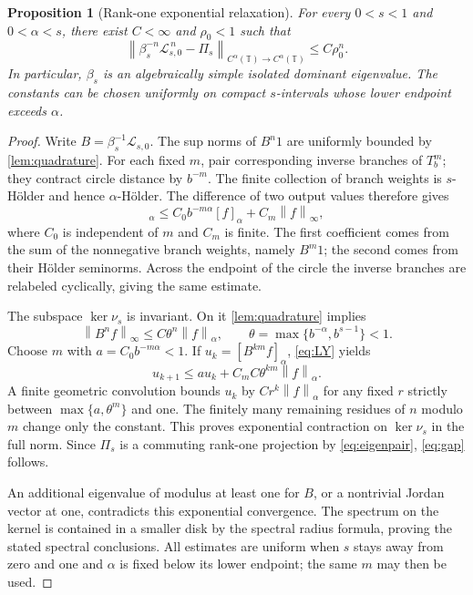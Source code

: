 \documentclass[11pt,a4paper]{article}
\numberwithin{equation}{section}
\newtheorem{proposition}[proposition]{Proposition}
\theoremstyle{definition}
\theoremstyle{remark}
\newcommand{\TT}{\mathbb T}
\newcommand{\Lop}{\mathcal L}
\newcommand{\norm}[1]{\left\lVert#1\right\rVert}
\newcommand{\Proj}{\Pi}
\newcommand{\Holder}{C^\alpha(\TT)}
\begin{document}
\begin{proposition}[Rank-one exponential relaxation]
\label{prop:gap}
For every $0<s<1$ and $0<\alpha<s$, there exist $C<\infty$ and
$\rho_0<1$ such that
\begin{equation}
 \left\|\beta_s^{-n}\Lop_{s,0}^{\,n}-\Proj_s\right\|_{\Holder\to\Holder}
 \leq C\rho_0^n.
 \label{eq:gap}
\end{equation}
In particular, $\beta_s$ is an algebraically simple isolated dominant
eigenvalue. The constants can be chosen uniformly on compact
$s$-intervals whose lower endpoint exceeds $\alpha$.
\end{proposition}
\begin{proof}
Write $B=\beta_s^{-1}\Lop_{s,0}$. The sup norms of $B^n1$ are uniformly
bounded by \cref{lem:quadrature}. For each fixed $m$, pair corresponding
inverse branches of $T_b^m$; they contract circle distance by $b^{-m}$.
The finite collection of branch weights is $s$-H\"older and hence
$\alpha$-H\"older. The difference of two output values therefore gives
\begin{equation}
 [B^mf]_\alpha\leq C_0 b^{-m\alpha}[f]_\alpha+C_m\norm f_\infty,
 \label{eq:LY}
\end{equation}
where $C_0$ is independent of $m$ and $C_m$ is finite. The first
coefficient comes from the sum of the nonnegative branch weights,
namely $B^m1$; the second comes from their H\"older seminorms.
Across the endpoint of the circle the inverse branches are relabeled
cyclically, giving the same estimate.

The subspace $\ker\nu_s$ is invariant. On it \cref{lem:quadrature}
implies
\[
 \norm{B^nf}_\infty\leq C\theta^n\norm f_\alpha,
 \qquad \theta=\max\{b^{-\alpha},b^{s-1}\}<1.
\]
Choose $m$ with $a=C_0b^{-m\alpha}<1$. If
$u_k=[B^{km}f]_\alpha$, \cref{eq:LY} yields
\[
 u_{k+1}\leq a u_k+C_mC\theta^{km}\norm f_\alpha.
\]
A finite geometric convolution bounds $u_k$ by $C r^k\norm f_\alpha$
for any fixed $r$ strictly between $\max\{a,\theta^m\}$ and one.
The finitely many remaining residues of $n$ modulo $m$ change only the
constant. This proves exponential contraction on $\ker\nu_s$ in the
full norm. Since $\Proj_s$ is a commuting rank-one projection by
\cref{eq:eigenpair}, \cref{eq:gap} follows.

An additional eigenvalue of modulus at least one for $B$, or a
nontrivial Jordan vector at one, contradicts this exponential convergence.
The spectrum on the kernel is contained in a smaller disk by the
spectral radius formula, proving the stated spectral conclusions.
All estimates are uniform when $s$ stays away from zero and one and
$\alpha$ is fixed below its lower endpoint; the same $m$ may then be used.
\end{proof}
\end{document}
